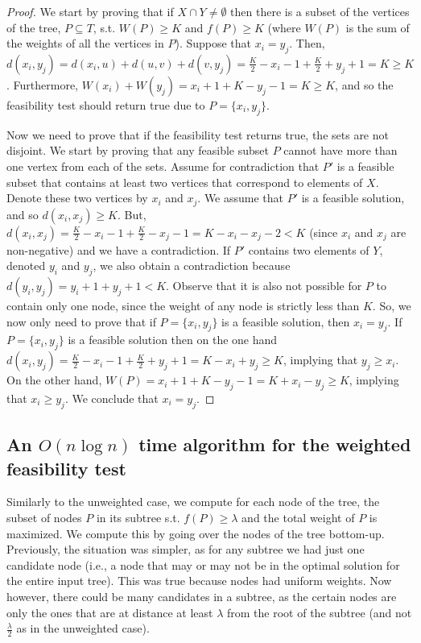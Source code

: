 \documentclass[11pt,a4paper]{article}
\theoremstyle{definition}
\theoremstyle{remark}
\begin{document}
\begin{proof}
We start by proving that if $X \cap Y \neq \emptyset$ then there is a subset of the vertices of the tree, $P \subseteq T$, s.t. $W(P) \geq K$ and $f(P) \geq K$ (where $W(P)$ is the sum of the weights of all the vertices in $P$). Suppose that  $x_i=y_j$. Then, $d(x_i,y_j) = d(x_i,u) + d(u,v) + d(v,y_j) = \frac{K}{2} - x_i -1 + \frac{K}{2} + y_j +1 = K \geq K$. Furthermore, $W(x_i) + W(y_j) = x_i + 1 + K- y_j -1 = K \geq K$, and so the feasibility test should return true due to $P = \lbrace x_i, y_j \rbrace$.

Now we need to prove that if the feasibility test returns true, the sets are not disjoint.
We start by proving that any feasible subset $P$ cannot have more than one vertex from each of the sets.
Assume for contradiction that $P'$ is a feasible subset that contains at least two vertices that correspond to elements of $X$. Denote these two vertices by $x_i$ and $x_j$. We assume that $P'$ is a feasible solution, and so $d(x_i,x_j) \geq K$. But, $d(x_i,x_j) = \frac{K}{2} - x_i -1 + \frac{K}{2} - x_j -1 = K - x_i - x_j -2 < K$ (since $x_i$ and $x_j$ are non-negative) and we have a contradiction.
If $P'$ contains two elements of $Y$, denoted $y_{i}$ and $y_{j}$, we also obtain a contradiction because
$d(y_{i},y_{j})=y_{i}+1+y_{j}+1<K$.
Observe that it is also not possible for $P$ to contain only one node, since the weight of any node is strictly less than $K$. So, we now only need to prove that if $P= \{ x_i,y_j \}$ is a feasible solution, then $x_i = y_j$.
If $P= \{ x_i,y_j \}$ is a feasible solution then on the one hand $d(x_i,y_j) = \frac{K}{2} - x_i -1 + \frac{K}{2} + y_j +1 = K - x_i + y_j \geq K$, implying that $y_j \geq x_i$. On the other hand, $W(P) = x_i + 1 + K - y_j -1 = K + x_i - y_j \geq K$, implying that $x_i \geq y_j$. We conclude that $x_i = y_j$.
\end{proof}


\subsection{An \texorpdfstring{\boldmath$ O(n\log n)$}{O(nlogn)} time algorithm for the weighted feasibility test}\label{weighted f.t.}


Similarly to the unweighted case, we compute for each node of the tree, the subset of nodes $P$ in its subtree  s.t. $f(P) \geq \lambda$ and the total  weight of  $P$ is maximized. We compute this by going over the nodes of the tree bottom-up. Previously, the situation was simpler, as for any subtree we had just one candidate node (i.e., a node that may or may not be in the optimal solution for the entire input tree). This was true because nodes had uniform weights. Now however, there could be many candidates in a subtree, as the certain nodes are only the ones that are at distance at least $\lambda$ from the root of the subtree (and not $\frac{\lambda}{2}$ as in the unweighted case).
\end{document}
